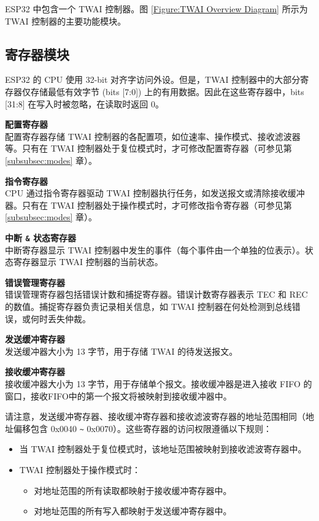 \documentclass[main\_\_CN.tex]{subfiles}
\begin{document}
ESP32 中包含一个 TWAI 控制器。图 \ref{Figure:TWAI Overview Diagram} 所示为 TWAI 控制器的主要功能模块。

\subsection{寄存器模块}
ESP32 的 CPU 使用 32-bit 对齐字访问外设。但是，TWAI 控制器中的大部分寄存器仅存储最低有效字节 (bits [7:0]) 上的有用数据。因此在这些寄存器中，bits [31:8] 在写入时被忽略，在读取时返回 0。

{\bfseries 配置寄存器}\\
配置寄存器存储 TWAI 控制器的各配置项，如位速率、操作模式、接收滤波器等。只有在 TWAI 控制器处于复位模式时，才可修改配置寄存器（可参见第 \ref{subsubsec:modes} 章）。

{\bfseries 指令寄存器}\\
CPU 通过指令寄存器驱动 TWAI 控制器执行任务，如发送报文或清除接收缓冲器。只有在 TWAI 控制器处于操作模式时，才可修改指令寄存器（可参见第 \ref{subsubsec:modes} 章）。

{\bfseries 中断 \verb+&+ 状态寄存器}\\
中断寄存器显示 TWAI 控制器中发生的事件（每个事件由一个单独的位表示）。状态寄存器显示 TWAI 控制器的当前状态。

{\bfseries 错误管理寄存器}\\
错误管理寄存器包括错误计数和捕捉寄存器。错误计数寄存器表示 TEC 和 REC 的数值。捕捉寄存器负责记录相关信息，如 TWAI 控制器在何处检测到总线错误，或何时丢失仲裁。

{\bfseries 发送缓冲寄存器}\\
发送缓冲器大小为 13 字节，用于存储 TWAI 的待发送报文。

{\bfseries 接收缓冲寄存器}\\
接收缓冲器大小为 13 字节，用于存储单个报文。接收缓冲器是进入接收 FIFO 的窗口，接收FIFO中的第一个报文将被映射到接收缓冲器中。

请注意，发送缓冲寄存器、接收缓冲寄存器和接收滤波寄存器的地址范围相同（地址偏移包含 0x0040 \verb+~+ 0x0070）。这些寄存器的访问权限遵循以下规则：

\begin{itemize}
    \item 当 TWAI 控制器处于复位模式时，该地址范围被映射到接收滤波寄存器中。
    \item TWAI 控制器处于操作模式时：
    \begin{itemize}
        \item 对地址范围的所有读取都映射于接收缓冲寄存器中。
        \item 对地址范围的所有写入都映射于发送缓冲寄存器中。
    \end{itemize}
\end{itemize}
\end{document}
